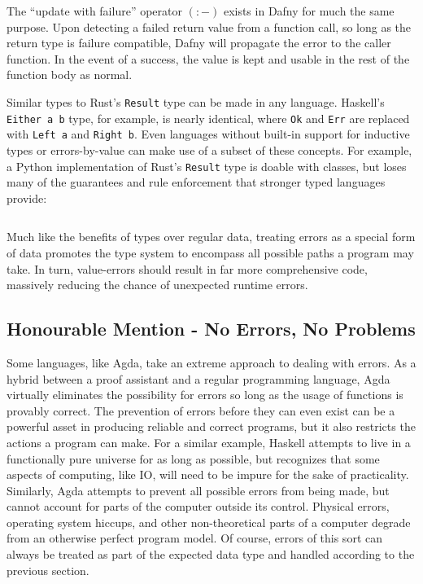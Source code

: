 \documentclass{article}
\begin{document}
The ``update with failure'' operator $(\colon -)$ exists in Dafny for much the same purpose. Upon detecting a failed return value from
a function call, so long as the return type is failure compatible, Dafny will propagate the error to the caller function.
In the event of a success, the value is kept and usable in the rest of the function body as normal.

Similar types to Rust's \texttt{Result} type can be made in any language.
Haskell's \texttt{Either a b} type, for example, is nearly identical, where \texttt{Ok} and \texttt{Err}
are replaced with \texttt{Left a} and \texttt{Right b}.
Even languages without built-in support for inductive types or
errors-by-value can make use of a subset of these concepts. For example,
a Python implementation of Rust's \texttt{Result} type is doable with classes, but loses many of the guarantees
and rule enforcement that stronger typed languages provide:
\inputminted{python}{linked_list/python_result.py}

Much like the benefits of types over regular data, treating errors as a special form of data
promotes the type system to encompass all possible paths a program may take. In turn,
value-errors should result in far more comprehensive code, massively reducing the chance of unexpected runtime errors.

\subsection{Honourable Mention - No Errors, No Problems}

Some languages, like Agda, take an extreme approach to dealing with errors. As a hybrid between a proof assistant
and a regular programming language, Agda virtually eliminates the possibility for errors so long as the usage of
functions is provably correct. The prevention of errors before they can even exist can be a powerful asset
in producing reliable and correct programs, but it also restricts the actions a program can make. For a similar example,
Haskell attempts to live in a functionally pure universe for as long as possible, but recognizes that some
aspects of computing, like IO, will need to be impure for the sake of practicality. Similarly, Agda attempts
to prevent all possible errors from being made, but cannot account for parts of the computer outside its control.
Physical errors, operating system hiccups, and other non-theoretical parts of a computer degrade from an otherwise
perfect program model. Of course, errors of this sort can always be treated as part of the expected data type and
handled according to the previous section.
\end{document}
